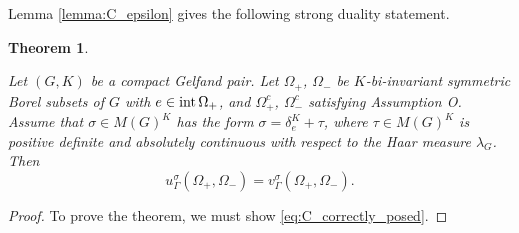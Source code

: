 \documentclass[[a4paper,english,12pt]{amsart}
\theoremstyle{plain}
\newtheorem{theorem}{Theorem}
\theoremstyle{remark}
\newcommand{\intt}{\mbox{\rm int\,}}
\begin{document}
Lemma \ref{lemma:C_epsilon} gives the following strong duality statement.

\begin{theorem}\label{main_theorem}

Let $(G,K)$ be a compact Gelfand pair. Let $\Omega_+$, $\Omega_-$ be $K$-bi-invariant symmetric Borel subsets of $G$ with $e \in \intt{\Omega_+}$, and $\Omega_+^c$, $\Omega_-^c$ satisfying Assumption O. Assume that $\sigma\in M(G)^K$ has the form $\sigma = \delta_e^K + \tau $, where \(\tau \in M(G)^K\) is positive definite and absolutely continuous with respect to the Haar measure $\lambda_G$. Then
$$
u_\Gamma^{\sigma}(\Omega_+, \Omega_-) = v_\Gamma^{\sigma}(\Omega_+, \Omega_-).
$$

\end{theorem}

\begin{proof}

To prove the theorem, we must show \eqref{eq:C_correctly_posed}.


\end{proof}
\end{document}
